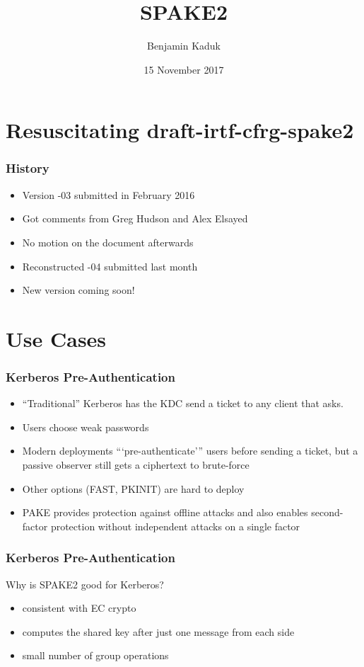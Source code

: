 \documentclass{beamer}
\title{SPAKE2}
\author{Benjamin Kaduk}
\date{15 November 2017}
\begin{document}
\begin{frame}
\titlepage
\end{frame}

\section{Resuscitating draft-irtf-cfrg-spake2}

\begin{frame}
\frametitle{History}
\begin{itemize}
\item{Version -03 submitted in February 2016}
\item{Got comments from Greg Hudson and Alex Elsayed}
\item{No motion on the document afterwards}
\item{Reconstructed -04 submitted last month}
\item{New version coming soon!}
\end{itemize}
\end{frame}

\section{Use Cases}

\begin{frame}
\frametitle{Kerberos Pre-Authentication}
\begin{itemize}
\item{``Traditional'' Kerberos has the KDC send a ticket to any client that asks.}
\item{Users choose weak passwords}
\item{Modern deployments ```pre-authenticate''' users before sending a ticket,
but a passive observer still gets a ciphertext to brute-force}
\item{Other options (FAST, PKINIT) are hard to deploy}
\item{PAKE provides protection against offline attacks and also enables
second-factor protection without independent attacks on a single factor}
\end{itemize}
\end{frame}

\begin{frame}
\frametitle{Kerberos Pre-Authentication}
Why is SPAKE2 good for Kerberos?
\begin{itemize}
\item{consistent with EC crypto}
\item{computes the shared key after just one message from each side}
\item{small number of group operations}
\end{itemize}
\end{frame}
\end{document}
